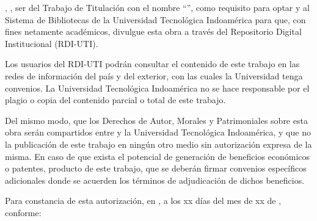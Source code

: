
\UTIAutoresPronombre, \UTIAutoresTexto, \UTIVerboDeclaro{} ser \UTIAutorEtiquetaMin{} del Trabajo de Titulación con el nombre ``\UTITituloProyecto'', como requisito para optar \UTIFraseOptarTituloProfesional{} y \UTIVerboAutorizo{} al Sistema de Bibliotecas de la Universidad Tecnológica Indoamérica para que, con fines netamente académicos, divulgue esta obra a través del Repositorio Digital Institucional (RDI-UTI).

Los usuarios del RDI-UTI podrán consultar el contenido de este trabajo en las redes de información del país y del exterior, con las cuales la Universidad tenga convenios. La Universidad Tecnológica Indoamérica no se hace responsable por el plagio o copia del contenido parcial o total de este trabajo.
	        
Del mismo modo, \UTIVerboAcepto{} que los Derechos de Autor, Morales y Patrimoniales sobre esta obra serán compartidos entre \UTIAutoresPoseedor{} y la Universidad Tecnológica Indoamérica, y que no \UTIVerboTramito{} la publicación de este trabajo en ningún otro medio sin autorización expresa de la misma. En caso de que exista el potencial de generación de beneficios económicos o patentes, producto de este trabajo, \UTIVerboAcepto{} que se deberán firmar convenios específicos adicionales donde se acuerden los términos de adjudicación de dichos beneficios.

Para constancia de esta autorización, en \UTICiudadPais, a los xx días del mes de xx de \UTIAnio, \UTIVerboFirmo{} conforme:

\vspace{1cm}

\UTIRepositorioAutoresBloque